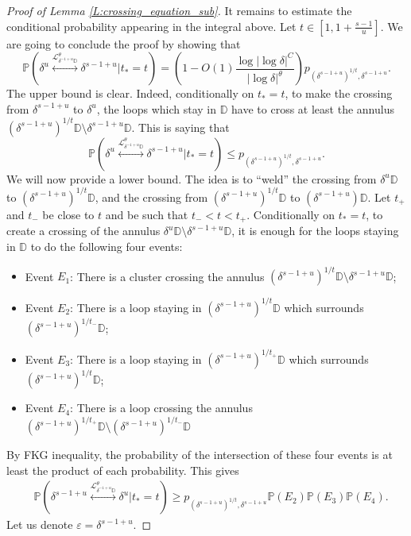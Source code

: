 \documentclass[11pt]{article}
\theoremstyle{remark}
\newcommand{\D}{\mathbb{D}}
\newcommand{\Lc}{\mathcal{L}}
\newcommand{\Prob}[1]{\mathbb{P} \left( #1 \right) }
\newcommand{\eps}{\varepsilon}
\numberwithin{equation}{section}
\begin{document}
\begin{proof}[Proof of Lemma \ref{L:crossing_equation_sub}]
It remains to estimate the conditional probability appearing in the integral above.
Let $t \in [1, 1 + \frac{s-1}{u}]$.
We are going to conclude the proof by showing that
\begin{equation}
\label{E:proof_1234}
\Prob{ \delta^u \overset{\Lc_{\delta^{-1+u} \D}^\theta}{\longleftrightarrow} \delta^{s-1+u} \Big\vert t_* = t}
= \left( 1 - O(1) \frac{\log |\log \delta|^C}{|\log \delta|^\theta} \right) p_{(\delta^{s-1+u})^{1/t},\delta^{s-1+u}}.
\end{equation}
The upper bound is clear. Indeed,
conditionally on $t_* = t$, to make the crossing from $\delta^{s-1+u}$ to $\delta^u$, the loops which stay in $\D$ have to cross at least the annulus $(\delta^{s-1+u})^{1/t} \D \setminus \delta^{s-1+u} \D$. This is saying that
\[
\Prob{ \delta^u \overset{\Lc_{\delta^{-1+u} \D}^\theta}{\longleftrightarrow} \delta^{s-1+u} \Big\vert t_* = t}
\leq p_{(\delta^{s-1+u})^{1/t}, \delta^{s-1+u}}.
\]
We will now provide a lower bound. The idea is to ``weld'' the crossing from $\delta^u \D$ to $(\delta^{s-1+u})^{1/t} \D$, and the crossing from $(\delta^{s-1+u})^{1/t} \D$ to $(\delta^{s-1+u}) \D$. Let $t_+$ and $t_-$ be close to $t$ and be such that $t_- < t < t_+$.
Conditionally on $t_* = t$, to create a crossing of the annulus $\delta^u \D \setminus \delta^{s-1+u} \D$, it is enough for the loops staying in $\D$ to do the following four events:
\begin{itemize}
\item
Event $E_1$: There is a cluster crossing the annulus $(\delta^{s-1+u})^{1/t} \D \setminus \delta^{s-1+u} \D$;
\item
Event $E_2$: There is a loop staying in $(\delta^{s-1+u})^{1/t} \D$ which surrounds $(\delta^{s-1+u})^{1/t_-} \D$;
\item
Event $E_3$: There is a loop staying in $(\delta^{s-1+u})^{1/t_+} \D$ which surrounds $(\delta^{s-1+u})^{1/t} \D$;
\item
Event $E_4$: There is a loop crossing the annulus $(\delta^{s-1+u})^{1/t_+} \D \setminus (\delta^{s-1+u})^{1/t_-} \D$
\end{itemize}
By FKG inequality, the probability of the intersection of these four events is at least the product of each probability. This gives
\begin{align*}
& \Prob{ \delta^{s-1+u} \overset{\Lc_{\delta^{-1+u} \D}^\theta}{\longleftrightarrow} \delta^u \Big\vert t_* = t}
\geq p_{(\delta^{s-1+u})^{1/t},\delta^{s-1+u}} \Prob{E_2} \Prob{E_3} \Prob{E_4}.
\end{align*}
Let us denote $\eps = \delta^{s-1+u}$.

\end{proof}
\end{document}
